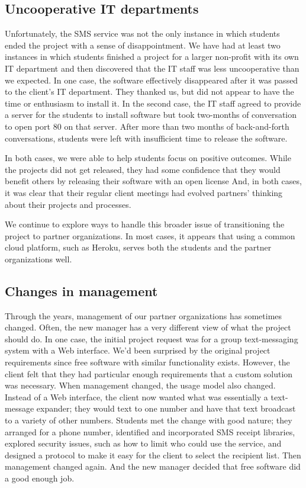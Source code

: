 \subsection{Uncooperative IT departments}

Unfortunately, the SMS service was not the only instance in which
students ended the project with a sense of disappointment.  We have
had at least two instances in which students finished a project for
a larger non-profit with its own IT department and then discovered
that the IT staff was less uncooperative than we expected.  In one
case, the software effectively disappeared after it was passed to
the client's IT department.  They thanked us, but did not appear
to have the time or enthusiasm to install it.  In the second case,
the IT staff agreed to provide a server for the students to install
software but took two-months of conversation to open port 80 on
that server.  After more than two months of back-and-forth
conversations, students were left with insufficient time to release
the software.

In both cases, we were able to help students focus on positive
outcomes.  While the projects did not get released, they had some
confidence that they would benefit others by releasing their software
with an open license And, in both cases, it was clear that their
regular client meetings had evolved partners' thinking about their
projects and processes.

We continue to explore ways to handle this broader issue of
transitioning the project to partner organizations.  In most cases,
it appears that using a common cloud platform, such as Heroku,
serves both the students and the partner organizations well.

\subsection{Changes in management}

Through the years, management of our partner organizations has
sometimes changed.  Often, the new manager has a very different
view of what the project should do.  In one case, the initial project
request was for a group text-messaging system with a Web interface.
We'd been surprised by the original project requirements since
free software with similar functionality exists.  However, the
client felt that they had particular enough requirements that a custom
solution was necessary.  When management changed, the usage model
also changed.  Instead of a Web interface, the client now wanted
what was essentially a text-message expander; they would text to
one number and have that text broadcast to a variety of other
numbers.  Students met the change with good nature; they arranged
for a phone number, identified and incorporated SMS receipt libraries,
explored security issues, such as how to limit who could use the
service, and designed a protocol to make it easy for the client to
select the recipient list.  Then management changed again.  And the
new manager decided that free software did a good enough job.

